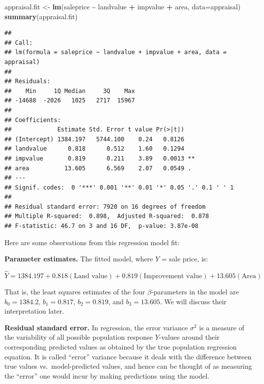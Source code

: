 \documentclass[
]{book}
\newenvironment{Shaded}{\begin{snugshade}}{\end{snugshade}}
\newcommand{\AttributeTok}[1]{\textcolor[rgb]{0.13,0.29,0.53}{#1}}
\newcommand{\FunctionTok}[1]{\textcolor[rgb]{0.13,0.29,0.53}{\textbf{#1}}}
\newcommand{\NormalTok}[1]{#1}
\newcommand{\OtherTok}[1]{\textcolor[rgb]{0.56,0.35,0.01}{#1}}
\newcommand{\SpecialCharTok}[1]{\textcolor[rgb]{0.81,0.36,0.00}{\textbf{#1}}}
\begin{document}
\begin{Shaded}
\begin{Highlighting}[]
\NormalTok{appraisal.fit }\OtherTok{\textless{}{-}} \FunctionTok{lm}\NormalTok{(saleprice }\SpecialCharTok{\textasciitilde{}}\NormalTok{ landvalue }\SpecialCharTok{+}\NormalTok{ impvalue }\SpecialCharTok{+}\NormalTok{ area, }\AttributeTok{data=}\NormalTok{appraisal)}
\FunctionTok{summary}\NormalTok{(appraisal.fit)}
\end{Highlighting}
\end{Shaded}

\begin{verbatim}
## 
## Call:
## lm(formula = saleprice ~ landvalue + impvalue + area, data = appraisal)
## 
## Residuals:
##    Min     1Q Median     3Q    Max 
## -14688  -2026   1025   2717  15967 
## 
## Coefficients:
##             Estimate Std. Error t value Pr(>|t|)   
## (Intercept) 1384.197   5744.100    0.24   0.8126   
## landvalue      0.818      0.512    1.60   0.1294   
## impvalue       0.819      0.211    3.89   0.0013 **
## area          13.605      6.569    2.07   0.0549 . 
## ---
## Signif. codes:  0 '***' 0.001 '**' 0.01 '*' 0.05 '.' 0.1 ' ' 1
## 
## Residual standard error: 7920 on 16 degrees of freedom
## Multiple R-squared:  0.898,  Adjusted R-squared:  0.878 
## F-statistic: 46.7 on 3 and 16 DF,  p-value: 3.87e-08
\end{verbatim}

Here are some observations from this regression model fit:

\textbf{Parameter estimates.} The fitted model, where \(Y\) = sale price, is:

\[\hat{Y} = 1384.197 + 0.818(\textrm{Land value}) + 0.819(\textrm{Improvement value}) + 13.605(\textrm{Area})\]

That is, the least squares estimates of the four \(\beta\)-parameters in the model are \(b_0 = 1384.2\), \(b_1 = 0.817\), \(b_2 = 0.819\), and \(b_3 = 13.605\).
We will discuss their interpretation later.

\textbf{Residual standard error.} In regression, the error variance \(\sigma^2\) is a measure of the variability of all possible population response \(Y\)-values around their corresponding predicted values as obtained by the true population regression equation.
It is called ``error'' variance because it deals with the difference between true values vs.~model-predicted values, and hence can be thought of as measuring the ``error'' one would incur by making predictions using the model.
\end{document}
